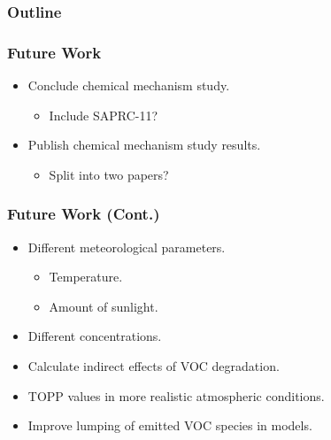 \begin{frame}
    \frametitle{Outline} 
    \tableofcontents[currentsection]
\end{frame} 

\begin{frame}
    \frametitle{Future Work}

    \begin{itemize}
        \item Conclude chemical mechanism study.
            \begin{itemize}
                \item Include SAPRC-11?
            \end{itemize}
        \item Publish chemical mechanism study results.
            \begin{itemize}
                \item Split into two papers?
            \end{itemize}
    \end{itemize}
\end{frame}

\begin{frame}
    \frametitle{Future Work (Cont.)}
    \begin{itemize}
        \item Different meteorological parameters.
            \begin{itemize}
                \item Temperature.
                \item Amount of sunlight.
            \end{itemize}
        \item Different  concentrations.
        \item Calculate indirect effects of VOC degradation.
        \item TOPP values in more realistic atmospheric conditions.
        \item Improve lumping of emitted VOC species in models.
    \end{itemize} 
\end{frame} 
